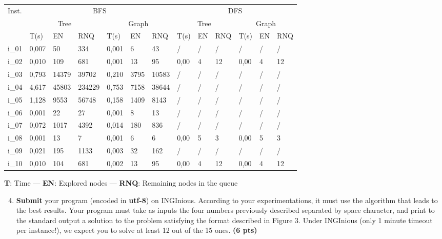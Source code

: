 \documentclass[11pt,a4paper]{../template/report}
\begin{document}
\begin{answers}[7cm]
\small
\begin{center}
\begin{tabular}{||l|l|l|l|l|l|l|l|l|l|l|l|l||}
\hline
\multirow{3}{*}{Inst.} & \multicolumn{6}{c|}{BFS} & \multicolumn{6}{c||}{DFS} \\
\cline{2-13}
& \multicolumn{3}{c|}{Tree} & \multicolumn{3}{c|}{Graph} & \multicolumn{3}{c|}{Tree} & \multicolumn{3}{c||}{Graph}\\
\cline{2-13}
 & T(s) & EN & RNQ & T(s) & EN & RNQ & T(s) & EN & RNQ & T(s) & EN & RNQ\\
\hline
i\_01 & 0,007 & 50 & 334 & 0,001 & 6 & 43 & / & / & / & / & / & / \\
\hline
i\_02 & 0,010 & 109 & 681 & 0,001 & 13 & 95 & 0,00 & 4 & 12 & 0,00 & 4 & 12 \\
\hline
i\_03 & 0,793 & 14379 & 39702 & 0,210 & 3795 & 10583 & / & / & / & / & / & / \\
\hline
i\_04 & 4,617 & 45803 & 234229 & 0,753 & 7158 & 38644 & / & / & / & / & / & / \\
\hline
i\_05 & 1,128 & 9553 & 56748 & 0,158 & 1409 & 8143 & / & / & / & / & / & / \\
\hline
i\_06 & 0,001 & 22 & 27 & 0,001 & 8 & 13 & / & / & / & / & / & / \\
\hline
i\_07 & 0,072 & 1017 & 4392 & 0,014 & 180 & 836 & / & / & / & / & / & / \\
\hline
i\_08 & 0,001 & 13 & 7 & 0,001 & 6 & 6 & 0,00 & 5 & 3 & 0,00 & 5 & 3\\
\hline
i\_09 & 0,021 & 195 & 1133& 0,003 & 32 & 162 & / & / & / & / & / & / \\
\hline
i\_10 & 0,010 & 104 & 681 & 0,002 & 13 & 95 & 0,00 & 4 & 12 & 0,00 & 4 & 12 \\
\hline
\end{tabular}
\end{center}
\textbf{T}: Time — \textbf{EN}: Explored nodes —
\textbf{RNQ}: Remaining nodes in the queue
\end{answers}



\begin{enumerate}
\setcounter{enumi}{3}
    \item \textbf{Submit} your program (encoded in \textbf{utf-8}) on INGInious. According to your experimentations, it must use the algorithm that leads to the best results. Your program must take as inputs the four numbers previously described separated by space character, and print to the standard output a solution to the problem satisfying the format described in Figure 3. Under INGInious (only 1 minute timeout per instance!), we expect you to solve at least 12 out of the 15 ones. \textbf{(6 pts)}
\end{enumerate}
\end{document}
